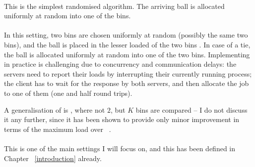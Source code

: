 \paragraph{\OneChoice}

This is the simplest randomised algorithm. The arriving ball is allocated uniformly at random into one of the bins.

\paragraph{\TwoChoice}
In this setting, two bins are chosen uniformly at random (possibly the same two bins), and the ball is placed in the lesser loaded of the two bins . In case of a tie, the ball is allocated uniformly at random into one of the two bins. Implementing \TwoChoice in practice is challenging due to concurrency and communication delays: the servers need to report their loads by interrupting their currently running process; the client has to wait for the response by both servers, and then allocate the job to one of them (one and half round trips).

A generalisation of \TwoChoice is \KChoice, where not $2$, but $K$ bins are compared -- I do not discuss it any further, since it has been shown to provide only minor improvement in terms of the maximum load over \TwoChoice~\cite{azar1999twochoice}.



\paragraph{\TwoThinning}

This is one of the main settings I will focus on, and this has been defined in Chapter ~\ref{introduction} already.


